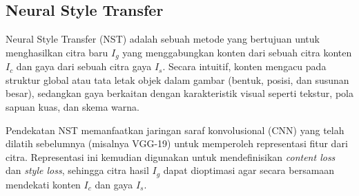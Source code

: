 \subsection{Neural Style Transfer}
Neural Style Transfer (NST) adalah sebuah metode yang bertujuan untuk menghasilkan citra baru $I_g$ yang menggabungkan konten dari sebuah citra konten $I_c$ dan gaya dari sebuah citra gaya $I_s$. Secara intuitif, konten mengacu pada struktur global atau tata letak objek dalam gambar (bentuk, posisi, dan susunan besar), sedangkan gaya berkaitan dengan karakteristik visual seperti tekstur, pola sapuan kuas, dan skema warna.

Pendekatan NST memanfaatkan jaringan saraf konvolusional (CNN) yang telah dilatih sebelumnya (misalnya VGG-19) untuk memperoleh representasi fitur dari citra. Representasi ini kemudian digunakan untuk mendefinisikan \textit{content loss} dan \textit{style loss}, sehingga citra hasil $I_g$ dapat dioptimasi agar secara bersamaan mendekati konten $I_c$ dan gaya $I_s$.

